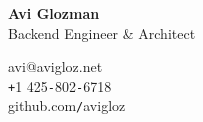 \documentclass[10pt,oneside,final]{article}
\begin{document}
	\pagestyle{empty}	
	\begin{flushleft}	
		{\huge \textbf{Avi Glozman}}\\
		{\large Backend Engineer \& Architect\\}
		\vspace{2mm}
		\begin{leftli}
			{\large avi@avigloz.net}\\
			\vspace{0.2cm}
			{\large \texttt{+}1 425\texttt{-}802\texttt{-}6718}\\
			\vspace{0.2cm}
			{\large github.com\texttt{/}avigloz }
		\end{leftli}
		\vspace{-2.7cm}
		\begin{flushright}
		\end{flushright}    
		\vfill
	\end{flushleft}
\end{document}
